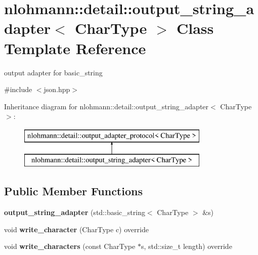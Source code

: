 \hypertarget{classnlohmann_1_1detail_1_1output__string__adapter}{}\section{nlohmann\+:\+:detail\+:\+:output\+\_\+string\+\_\+adapter$<$ Char\+Type $>$ Class Template Reference}
\label{classnlohmann_1_1detail_1_1output__string__adapter}


output adapter for basic\+\_\+string  




{\ttfamily \#include $<$json.\+hpp$>$}

Inheritance diagram for nlohmann\+:\+:detail\+:\+:output\+\_\+string\+\_\+adapter$<$ Char\+Type $>$\+:\begin{figure}[H]
\begin{center}
\leavevmode
\includegraphics[height=2.000000cm]{classnlohmann_1_1detail_1_1output__string__adapter}
\end{center}
\end{figure}
\subsection*{Public Member Functions}
\begin{DoxyCompactItemize}
\item 
\mbox{\label{classnlohmann_1_1detail_1_1output__string__adapter_a2086c9bd140c2ef28775fe190684fd68}} 
{\bfseries output\+\_\+string\+\_\+adapter} (std\+::basic\+\_\+string$<$ Char\+Type $>$ \&s)
\item 
\mbox{\label{classnlohmann_1_1detail_1_1output__string__adapter_ae66b8b2b776acd4fc20bcb24dc7a4fac}} 
void {\bfseries write\+\_\+character} (Char\+Type c) override
\item 
\mbox{\label{classnlohmann_1_1detail_1_1output__string__adapter_ad356f6e878ee105e72e66d18b665f623}} 
void {\bfseries write\+\_\+characters} (const Char\+Type $\ast$s, std\+::size\+\_\+t length) override
\end{DoxyCompactItemize}


